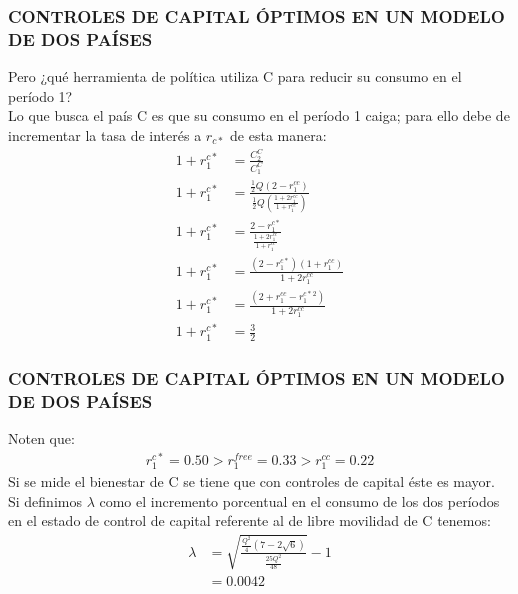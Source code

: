 \documentclass[10pt, xcolor=table, x11names]{beamer}
\begin{document}
\begin{frame}[label=16]
	\frametitle{{\normalsize CONTROLES DE CAPITAL ÓPTIMOS EN UN MODELO DE DOS PAÍSES} {}}
	Pero ¿qué herramienta de política utiliza C para reducir su consumo en el período 1? \\
	Lo que busca el país C es que su consumo en el período 1 caiga; para ello  debe de incrementar la tasa de interés a $r_{c*}$ de esta manera:
	\begin{align}
	1+r_{1}^{c*}&=\frac{C_{2}^{C}}{C_{1}^{C}}\nonumber\\
	1+r_{1}^{c*}&=\frac{\frac{1}{2}Q(2-r_{1}^{cc})}{\frac{1}{2}Q(\frac{1+2r_{1}^{cc}}{1+r_{1}^{cc}})}\nonumber\\
	1+r_{1}^{c*}&=\frac{2-r_{1}^{c*}}{\frac{1+2r_{1}^{cc}}{1+r_{1}^{cc}}}\nonumber\\
	1+r_{1}^{c*}&=\frac{(2-r_{1}^{c*})(1+r_{1}^{cc})}{1+2r_{1}^{cc}}\nonumber\\
	1+r_{1}^{c*}&=\frac{(2+r_{1}^{cc}-r_{1}^{c*}^{2})}{1+2r_{1}^{cc}}\nonumber\\
	1+r_{1}^{c*}&=\frac{3}{2}
	\end{align}
\end{frame}


\begin{frame}[label=17]
	\frametitle{{\normalsize CONTROLES DE CAPITAL ÓPTIMOS EN UN MODELO DE DOS PAÍSES} {}}
	Noten que:
	\begin{align}
	r_{1}^{c*}=0.50>r_{1}^{free}=0.33>r_{1}^{cc}=0.22
	\end{align}
	Si se mide el bienestar de C se tiene que con controles de capital éste es mayor.\\
	Si definimos $\lambda $ como el incremento porcentual en el consumo de los dos períodos en el estado de control de capital referente al de libre movilidad de C tenemos:
	\begin{align}
	\lambda&=\sqrt{\frac{\frac{Q^{2}}{4}(7-2\sqrt{6})}{\frac{25Q^{2}}{48}}} -1\nonumber\\
	&=0.0042\nonumber
	\end{align}
	
	\end{frame}
\end{document}
